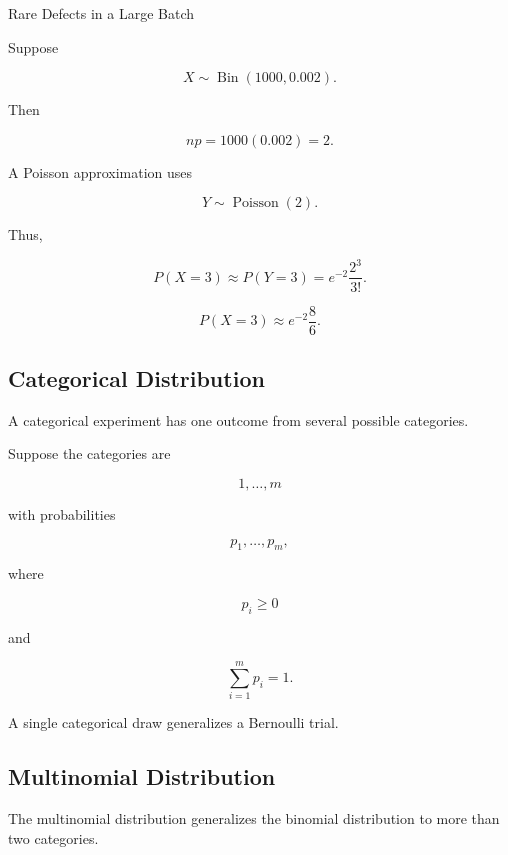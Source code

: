 \begin{workedexamplebox}{Rare Defects in a Large Batch}

Suppose

\[
X\sim\operatorname{Bin}(1000,0.002).
\]

Then

\[
np
=
1000(0.002)
=
2.
\]

A Poisson approximation uses

\[
Y\sim\operatorname{Poisson}(2).
\]

Thus,

\[
P(X=3)
\approx
P(Y=3)
=
e^{-2}\frac{2^3}{3!}.
\]

\begin{answerbox}
\[
\boxed{
P(X=3)
\approx
e^{-2}\frac{8}{6}.
}
\]
\end{answerbox}

\end{workedexamplebox}

\subsection{Categorical Distribution}
\label{subsec:categorical-distribution}

A categorical experiment has one outcome from several possible
categories.

Suppose the categories are

\[
1,\ldots,m
\]

with probabilities

\[
p_1,\ldots,p_m,
\]

where

\[
p_i\geq0
\]

and

\[
\sum_{i=1}^{m}p_i=1.
\]

A single categorical draw generalizes a Bernoulli trial.

\subsection{Multinomial Distribution}
\label{subsec:multinomial-distribution}

The multinomial distribution generalizes the binomial distribution to
more than two categories.

